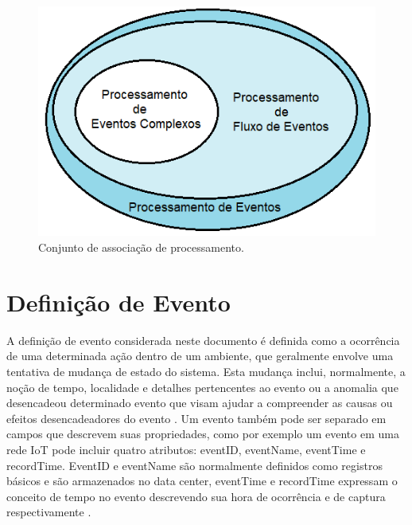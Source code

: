 \documentclass[tid,table]{texufpel} %
\begin{document}
\begin{figure}[ht]
	\centering
	\includegraphics[width=.6\textwidth]{imagens/ConjuntoProcessamento.png}
	\caption{Conjunto de associação de processamento.}
	\label{fig:ConjuntoProcessamento}
\end{figure}




\section{Definição de Evento}
A definição de evento considerada neste documento é definida como a ocorrência de uma determinada ação dentro de um ambiente, que geralmente envolve uma tentativa de mudança de estado do sistema. Esta mudança inclui, normalmente, a noção de tempo, localidade e detalhes pertencentes ao evento ou a anomalia que desencadeou determinado evento que visam ajudar a compreender as causas ou efeitos desencadeadores do evento \cite{fitzgerald2010common}.
Um evento também pode ser separado em campos que descrevem suas propriedades, como por exemplo um evento em uma rede IoT pode incluir quatro atributos: eventID, eventName, eventTime e recordTime. EventID e eventName são normalmente definidos como registros básicos e são armazenados no data center, eventTime e recordTime expressam o conceito de tempo no evento descrevendo sua hora de ocorrência e de captura respectivamente \cite{minbo2013information}. 
\end{document}

